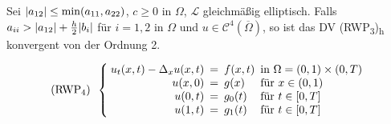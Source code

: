 \documentclass{cheat-sheet}
\newcommand{\Cont}{\mathcal{C}} %
\newcommand{\clos}[1]{\overline{#1}} %
\newcommand{\cOmega}{\clos{\Omega}} %
\newcommand{\LL}{\mathcal{L}} %
\newcommand{\Laplace}{\Delta}
\newcommand{\tss}[1]{\textsubscript{#1}} %
\begin{document}

\begin{satz}
  Sei $\lvert a_{12}\rvert \leq \min(a_{11}, a_{22})$, $c \geq 0$ in $\Omega$, $\LL$ gleichmäßig elliptisch.
  Falls $a_{ii} > \lvert a_{12}\rvert + \tfrac{h}{2} \lvert b_i\rvert$ für $i = 1, 2$ in $\Omega$ und $u \in \Cont^4(\cOmega)$, so ist das DV (RWP\tss{3})\tss{h} konvergent von der Ordnung 2.
\end{satz}


\begin{prob}\mbox{}
  \vspace{-1.5em}
  \[
    \arraycolsep=2.5pt
    \text{(RWP\tss{4})} \enspace \left\{
    \begin{array}{rcll}
      u_t(x,t) - \Laplace_x u(x, t) &=& f(x,t) &\text{in $\Omega = \ointerval{0}{1} \times \ointerval{0}{T}$} \\
      u(x,0) &=& g(x) & \text{für } x \in \ointerval{0}{1} \\
      u(0, t) &=& g_0(t) & \text{für } t \in \cinterval{0}{T} \\
      u(1, t) &=& g_1(t) & \text{für } t \in \cinterval{0}{T}
    \end{array} \right.
  \]
\end{prob}
\end{document}
